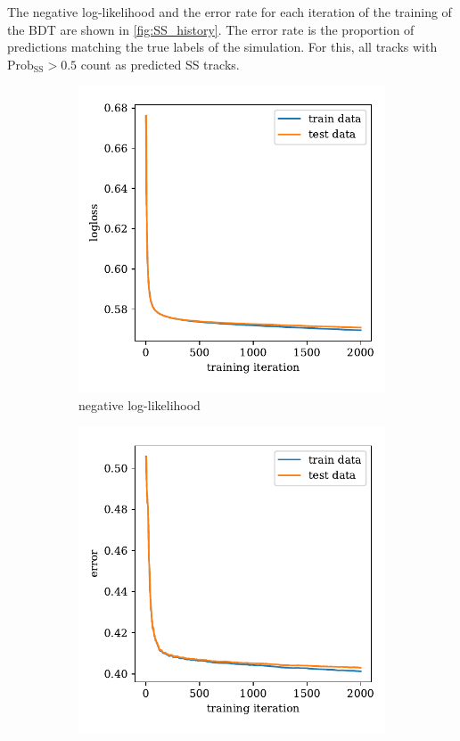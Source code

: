 The negative log-likelihood and the error rate for each iteration of the training of the BDT are shown in \cref{fig:SS_history}.
The error rate is the proportion of predictions matching the true labels of the simulation. %
For this, all tracks with $\text{Prob}_\text{SS}>0.5$ count as predicted SS tracks. 

\begin{figure}
    \centering
    \begin{subfigure}{0.5\textwidth}
        \centering
        \includegraphics[width=\textwidth]{images/SS_history_logloss.pdf}
        \caption{negative log-likelihood}
    \end{subfigure}%
    \begin{subfigure}{0.5\textwidth}
        \centering
        \includegraphics[width=\textwidth]{images/SS_history_error.pdf}

\end{subfigure}
\end{figure}
